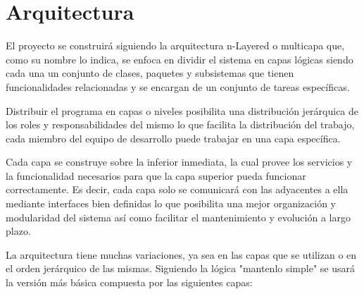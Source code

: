 %
%
%
%
\section{Arquitectura}

El proyecto se construirá siguiendo la arquitectura n-Layered o multicapa que, como su nombre lo indica, se enfoca en dividir el sistema en capas lógicas siendo cada una un conjunto de clases, paquetes y subsistemas que tienen funcionalidades relacionadas y se encargan de un conjunto de tareas específicas. 

Distribuir el programa en capas o niveles posibilita una distribución jerárquica de los roles y responsabilidades del mismo lo que facilita la distribución del trabajo, cada miembro del equipo de desarrollo puede trabajar en una capa específica.

Cada capa se construye sobre la inferior inmediata, la cual provee los servicios y la funcionalidad necesarios para que la capa superior pueda funcionar correctamente. Es decir, cada capa solo se comunicará con las adyacentes a ella mediante interfaces bien definidas lo que posibilita una mejor organización y modularidad del sistema así como facilitar el mantenimiento y evolución a largo plazo.

La arquitectura tiene muchas variaciones, ya sea en las capas que se utilizan o en el orden jerárquico de las mismas. Siguiendo la lógica "mantenlo simple" se usará la versión más básica compuesta por las siguientes capas:

